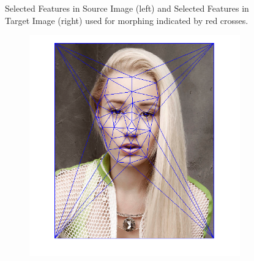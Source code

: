 \documentclass{paper}
\begin{document}
\begin{figure}[H]
\begin{subfigure}{0.45\textwidth}
    \end{subfigure}
    
    \caption{Selected Features in Source Image (left) and Selected Features in Target Image (right) used for morphing indicated by red crosses.}
    \label{fig:morphing_selected_features}       
\end{figure}

\begin{figure}[H]
    \centering
    \begin{subfigure}{0.45\textwidth}
        \includegraphics[width=\textwidth]{morph/triangulation_source}
    \end{subfigure}
    ~
        \begin{subfigure}{0.45\textwidth}

\end{subfigure}
\end{figure}
\end{document}
